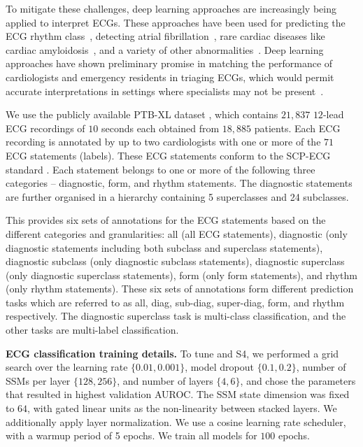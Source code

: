 
To mitigate these challenges, deep learning approaches are increasingly being applied to interpret ECGs. 
%
These approaches have been used for predicting the ECG rhythm class~\citep{hannun2019cardiologist}, detecting atrial fibrillation~\citep{attia2019artificial}, rare cardiac diseases like cardiac amyloidosis~\citep{goto2021artificial}, and a variety of other abnormalities~\citep{attia2019screening, siontis2021artificial}. 
%
Deep learning approaches have shown preliminary promise in matching the performance of cardiologists and emergency residents in triaging ECGs, which would permit accurate interpretations in settings where specialists may not be present~\citep{ribeiro2020automatic, hannun2019cardiologist}. 

We use the publicly available PTB-XL dataset \citep{Wagner:2020PTBXL, Wagner2020:ptbxlphysionet, Goldberger2020:physionet}, which contains $21{,}837$ $12$-lead ECG recordings of $10$ seconds each obtained from $18{,}885$ patients.
Each ECG recording is annotated by up to two cardiologists with one or more of the $71$ ECG statements (labels). 
%
These ECG statements conform to the SCP-ECG standard \citep{iso2009ecgstatements}. Each statement belongs to one or more of the following three categories -- diagnostic, form, and rhythm statements. The diagnostic statements are further organised in a hierarchy containing 5 superclasses and 24 subclasses.

This provides six sets of annotations for the ECG statements based on the different categories and granularities: all (all ECG statements), diagnostic (only diagnostic statements including both subclass and superclass statements), diagnostic subclass (only diagnostic subclass statements), diagnostic superclass (only diagnostic superclass statements), form (only form statements), and rhythm (only rhythm statements).
These six sets of annotations form different prediction tasks which are referred to as all, diag, sub-diag, super-diag, form, and rhythm respectively.
The diagnostic superclass task is multi-class classification, and the other tasks are multi-label classification.

\textbf{ECG classification training details.} To tune \ourmethod{} and S4, we performed a grid search over the learning rate $\{0.01, 0.001\}$, model dropout $\{0.1, 0.2\}$, number of SSMs per layer $\{128, 256\}$, and number of layers  $\{4,6\}$, and chose the parameters that resulted in highest validation AUROC. The SSM state dimension was fixed to $64$, with gated linear units as the non-linearity between stacked layers. We additionally apply layer normalization. We use a  cosine learning rate scheduler, with a warmup period of 5 epochs. We train all models for $100$ epochs. 



